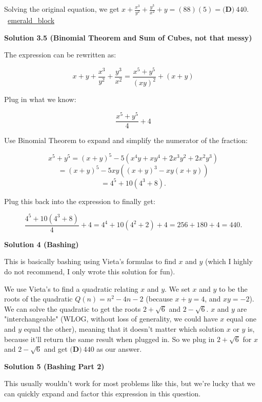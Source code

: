 \begin{enumerate}
Solving the original equation, we get $x + \frac{x^3}{y^2} + \frac{y^3}{x^2} + y = (88)(5) = \boxed{\textbf{(D)}\ 440}.$ ~\href{https://artofproblemsolving.com/wiki/index.php?title=User:Emerald\_block}{emerald\_block}

 



\textbf{Solution 3.5 (Binomial Theorem and Sum of Cubes, not that messy)}

The expression can be rewritten as: 

 
 \[x + y + \frac{x^3}{y^2} + \frac{y^3}{x^2} = \frac{x^5 + y^5}{(xy)^2} + (x + y)\] 

 Plug in what we know: 

 
 \[\frac{x^5 + y^5}{4} + 4\] 

 Use Binomial Theorem to expand and simplify the numerator of the fraction: 

 
 \[x^5 + y^5 = (x + y)^5 - 5(x^4y + xy^4 + 2x^3y^2 + 2x^2y^3)\]
 \[= (x + y)^5 -5xy((x + y)^3 - xy(x + y))\] 
 \[= 4^5 + 10(4^3 + 8).\] 

 Plug this back into the expression to finally get: 

 
 \[\frac{4^5 + 10(4^3 + 8)}{4} + 4 = 4^4 + 10(4^2 + 2) + 4 = 256 + 180 + 4 = \boxed{440}.\]




\textbf{Solution 4 (Bashing)}

This is basically bashing using Vieta's formulas to find $x$ and $y$ (which I highly do not recommend, I only wrote this solution for fun).

 We use Vieta's to find a quadratic relating $x$ and $y$. We set $x$ and $y$ to be the roots of the quadratic $Q ( n ) = n^2 - 4n - 2$ (because $x + y = 4$, and $xy = -2$). We can solve the quadratic to get the roots $2 + \sqrt{6}$ and $2 - \sqrt{6}$. $x$ and $y$ are "interchangeable" (WLOG, without loss of generality, we could have $x$ equal one and $y$ equal the other), meaning that it doesn't matter which solution $x$ or $y$ is, because it'll return the same result when plugged in. So we plug in $2 + \sqrt{6}$ for $x$ and $2 - \sqrt{6}$ and get $\boxed{\textbf{(D)}\ 440}$ as our answer.

 



\textbf{Solution 5 (Bashing Part 2)}

This usually wouldn't work for most problems like this, but we're lucky that we can quickly expand and factor this expression in this question.


\end{enumerate}
